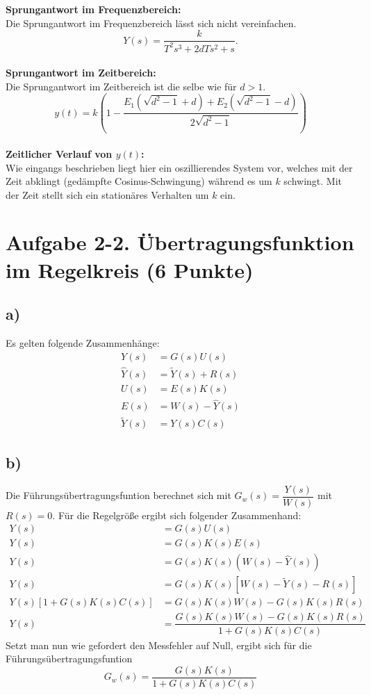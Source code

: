 \documentclass[11pt]{scrartcl} %
\begin{document}
\textbf{Sprungantwort im Frequenzbereich:}\\
Die Sprungantwort im Frequenzbereich lässt sich nicht vereinfachen.
\begin{equation*}
Y(s)=\dfrac{k}{T^2s^3+2dTs^2+s}.
\end{equation*}\\

\textbf{Sprungantwort im Zeitbereich:}\\
Die Sprungantwort im Zeitbereich ist die selbe wie für $d>1$.
\begin{equation*}
y(t) = k \left(1-\dfrac{E_1\left(\sqrt{d^2-1}+d\right) + E_2\left(\sqrt{d^2-1}-d\right)}{2 \sqrt{d^2-1}}\right)
\end{equation*}\\

\textbf{Zeitlicher Verlauf von $y(t)$:}\\
Wie eingangs beschrieben liegt hier ein oszillierendes System vor, welches mit der Zeit abklingt (gedämpfte Cosinus-Schwingung) während es um $k$ schwingt. Mit der Zeit stellt sich ein stationäres Verhalten um $k$ ein.



\section*{Aufgabe 2-2. Übertragungsfunktion im Regelkreis (6 Punkte)}
\subsection*{a)}
Es gelten folgende Zusammenhänge:
\begin{align*}
Y(s)&=G(s)U(s) \\
\hat{Y}(s)&=\tilde{Y}(s)+R(s)\\
U(s)&=E(s)K(s)\\
E(s)&=W(s)-\hat{Y}(s)\\
\tilde{Y}(s)&=Y(s)C(s)
\end{align*}

\subsection*{b)}
Die Führungsübertragungsfuntion berechnet sich mit $G_w(s)=\dfrac{Y(s)}{W(s)}$ mit $R(s)=0$. Für die Regelgröße ergibt sich folgender Zusammenhand:
\begin{align*}
Y(s)&=G(s)U(s)\\
Y(s)&=G(s)K(s)E(s)\\
Y(s)&=G(s)K(s)\left( W(s)-\hat{Y}(s) \right)\\
Y(s)&=G(s)K(s)\left[ W(s)-\tilde{Y}(s)-R(s) \right]\\
Y(s) \left[ 1+G(s)K(s)C(s) \right] &= G(s)K(s)W(s)-G(s)K(s)R(s)\\
Y(s)&= \dfrac{G(s)K(s)W(s)-G(s)K(s)R(s)}{1+G(s)K(s)C(s)}
\end{align*}
Setzt man nun wie gefordert den Messfehler auf Null, ergibt sich für die Führungsübertragungsfuntion
\begin{equation*}
G_w(s)= \dfrac{G(s)K(s)}{1+G(s)K(s)C(s)}
\end{equation*}
\end{document}
